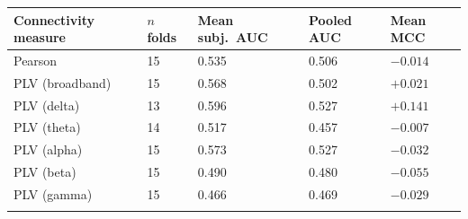 \documentclass[pdflatex,sn-basic,Numbered]{sn-jnl}
\makeatletter
\newenvironment{suptable}{\par\bigskip\noindent\begin{minipage}{\textwidth}\def\@captype{table}\centering\tablebodyfont}{\end{minipage}\par\bigskip}
\makeatother
\begin{document}
\begin{suptable}
\caption{Connectivity-measure comparison at reduced scale ($N=16$; Section~3.6). All seven measures are near chance, as is the gaze-free variant at full scale under Pearson correlation (Table~5); the topology surrogates of Section~3.3 show that the measured connectivity was not necessary for the decoder's accuracy. $n$ folds counts the folds of the 16 with an evaluable held-out metric in that run.}\label{tabS3}
\small
\begin{tabular*}{\linewidth}{@{\extracolsep{\fill}}lllll@{}}
\toprule
Connectivity measure & $n$ folds & Mean subj.\ AUC & Pooled AUC & Mean MCC \\
\midrule
Pearson & 15 & 0.535 & 0.506 & $-0.014$ \\
PLV (broadband) & 15 & 0.568 & 0.502 & $+0.021$ \\
PLV (delta) & 13 & 0.596 & 0.527 & $+0.141$ \\
PLV (theta) & 14 & 0.517 & 0.457 & $-0.007$ \\
PLV (alpha) & 15 & 0.573 & 0.527 & $-0.032$ \\
PLV (beta) & 15 & 0.490 & 0.480 & $-0.055$ \\
PLV (gamma) & 15 & 0.466 & 0.469 & $-0.029$ \\
\botrule
\end{tabular*}
\end{suptable}
\end{document}
